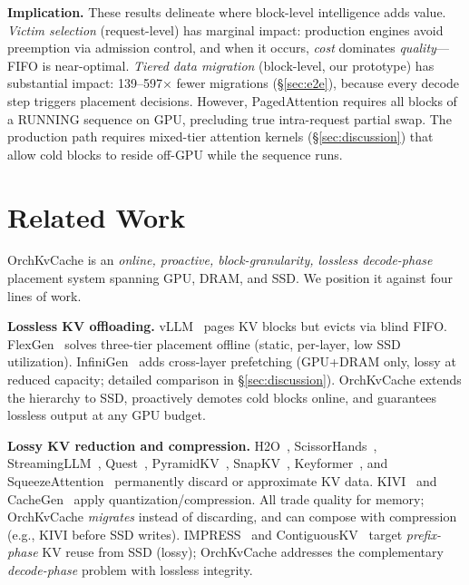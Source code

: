 \documentclass[conference]{IEEEtran}
\begin{document}
\textbf{Implication.} These results delineate where block-level intelligence adds value. \emph{Victim selection} (request-level) has marginal impact: production engines avoid preemption via admission control, and when it occurs, \emph{cost} dominates \emph{quality}---FIFO is near-optimal. \emph{Tiered data migration} (block-level, our prototype) has substantial impact: 139--597$\times$ fewer migrations (\S\ref{sec:e2e}), because every decode step triggers placement decisions. However, PagedAttention requires all blocks of a RUNNING sequence on GPU, precluding true intra-request partial swap. The production path requires mixed-tier attention kernels (\S\ref{sec:discussion}) that allow cold blocks to reside off-GPU while the sequence runs.

\section{Related Work}

OrchKvCache is an \emph{online, proactive, block-granularity, lossless decode-phase} placement system spanning GPU, DRAM, and SSD. We position it against four lines of work.

\textbf{Lossless KV offloading.}
vLLM~\cite{vllm} pages KV blocks but evicts via blind FIFO. FlexGen~\cite{flexgen} solves three-tier placement offline (static, per-layer, low SSD utilization). InfiniGen~\cite{infinigen} adds cross-layer prefetching (GPU+DRAM only, lossy at reduced capacity; detailed comparison in \S\ref{sec:discussion}). OrchKvCache extends the hierarchy to SSD, proactively demotes cold blocks online, and guarantees lossless output at any GPU budget.

\textbf{Lossy KV reduction and compression.}
H2O~\cite{h2o}, ScissorHands~\cite{scissorhands}, StreamingLLM~\cite{streamingllm}, Quest~\cite{quest}, PyramidKV~\cite{pyramidkv}, SnapKV~\cite{snapkv}, Keyformer~\cite{keyformer}, and SqueezeAttention~\cite{squeezeattention} permanently discard or approximate KV data. KIVI~\cite{kivi} and CacheGen~\cite{cachegen} apply quantization/compression. All trade quality for memory; OrchKvCache \emph{migrates} instead of discarding, and can compose with compression (e.g., KIVI before SSD writes). IMPRESS~\cite{impress} and ContiguousKV~\cite{contiguouskv} target \emph{prefix-phase} KV reuse from SSD (lossy); OrchKvCache addresses the complementary \emph{decode-phase} problem with lossless integrity.
\end{document}
